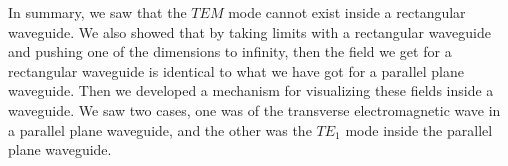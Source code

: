 In summary, we saw that the $TEM$ mode cannot exist inside a rectangular waveguide. We also showed that by taking limits with a rectangular waveguide and pushing one of the dimensions to infinity, then the field we get for a rectangular waveguide is identical to what we have got for a parallel plane waveguide. Then we developed a mechanism for visualizing these fields inside a waveguide. We saw two cases, one was of the transverse electromagnetic wave in a parallel plane waveguide, and the other was the ${TE_1}$ mode inside the parallel plane waveguide. 
